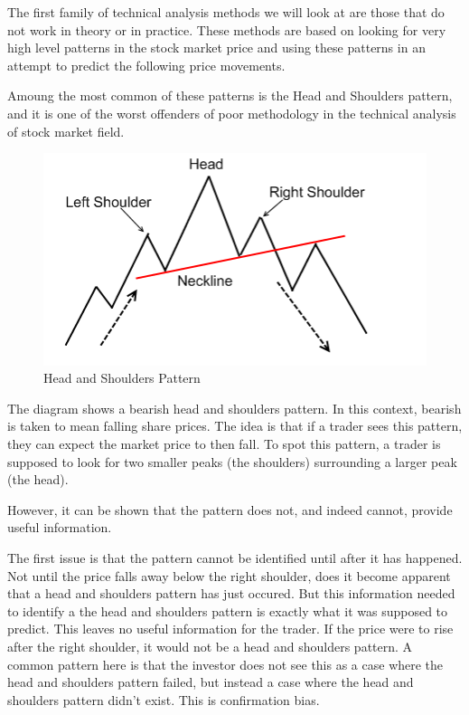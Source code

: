\documentclass{report}
\begin{document}
The first family of technical analysis methods we will look at are those that do not work in theory or in practice. These methods are based on looking for very high level patterns in the stock market price and using these patterns in an attempt to predict the following price movements.

Amoung the most common of these patterns is the Head and Shoulders pattern, and it is one of the worst offenders of poor methodology in the technical analysis of stock market field.

\begin{figure}[H]
	\caption{Head and Shoulders Pattern \cite{website:headshoulders}}
	\centerline{\includegraphics[width=\textwidth]{vis/headshoulders.png}}
	\label{fig:headshoulders}
\end{figure}

The diagram shows a bearish head and shoulders pattern. In this context, bearish is taken to mean falling share prices. The idea is that if a trader sees this pattern, they can expect the market price to then fall. To spot this pattern, a trader is supposed to look for two smaller peaks (the shoulders) surrounding a larger peak (the head). 

However, it can be shown that the pattern does not, and indeed cannot, provide useful information. 

The first issue is that the pattern cannot be identified until after it has happened. Not until the price falls away below the right shoulder, does it become apparent that a head and shoulders pattern has just occured. But this information needed to identify a the head and shoulders pattern is exactly what it was supposed to predict. This leaves no useful information for the trader. If the price were to rise after the right shoulder, it would not be a head and shoulders pattern. A common pattern here is that the investor does not see this as a case where the head and shoulders pattern failed, but instead a case where the head and shoulders pattern didn't exist. This is confirmation bias.
\end{document}
